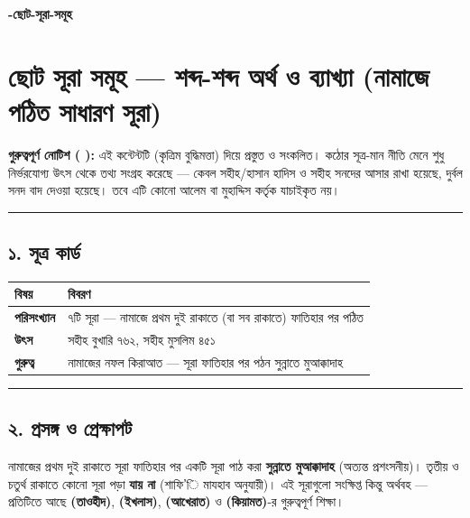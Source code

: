 

\begin{center}{\Large\bfseries\color{emerald} -ছোট-সূরা-সমূহ}\end{center}
\vspace{1em}
\section*{ছোট সূরা সমূহ — শব্দ-শব্দ অর্থ ও ব্যাখ্যা (নামাজে পঠিত সাধারণ সূরা)}

\begin{warnbox}
 \textbf{গুরুত্বপূর্ণ নোটিশ ( ):} এই কন্টেন্টটি  (কৃত্রিম বুদ্ধিমত্তা) দিয়ে প্রস্তুত ও সংকলিত।  কঠোর সূত্র-মান নীতি মেনে শুধু নির্ভরযোগ্য উৎস থেকে তথ্য সংগ্রহ করেছে — কেবল সহীহ/হাসান হাদিস ও সহীহ সনদের আসার রাখা হয়েছে, দুর্বল সনদ বাদ দেওয়া হয়েছে। তবে এটি কোনো আলেম বা মুহাদ্দিস কর্তৃক যাচাইকৃত নয়।
\end{warnbox}

\medskip\hrule\medskip

\subsection*{১. সূত্র কার্ড}

\begin{table}[h]\centering\small
\begin{tabular}{ll}
বিষয় & বিবরণ \\
\hline
\textbf{পরিসংখ্যান} & ৭টি সূরা — নামাজে প্রথম দুই রাকাতে (বা সব রাকাতে) ফাতিহার পর পঠিত \\
\textbf{উৎস} & সহীহ বুখারি ৭৬২, সহীহ মুসলিম ৪৫১ \\
\textbf{গুরুত্ব} & নামাজের নফল কিরাআত — সূরা ফাতিহার পর পঠন সুন্নাতে মুআক্কাদাহ \\
\hline
\end{tabular}
\end{table}

\medskip\hrule\medskip

\subsection*{২. প্রসঙ্গ ও প্রেক্ষাপট}

নামাজের প্রথম দুই রাকাতে সূরা ফাতিহার পর একটি সূরা পাঠ করা \textbf{সুন্নাতে মুআক্কাদাহ} (অত্যন্ত প্রশংসনীয়)। তৃতীয় ও চতুর্থ রাকাতে কোনো সূরা পড়া \textbf{যায় না} (শাফি'ি মাযহাব অনুযায়ী)। এই সূরাগুলো সংক্ষিপ্ত কিন্তু অর্থবহ — প্রতিটিতে আছে \textbf{ (তাওহীদ)}, \textbf{ (ইখলাস)}, \textbf{ (আখেরাত)} ও \textbf{ (কিয়ামত)}-র গুরুত্বপূর্ণ শিক্ষা।

